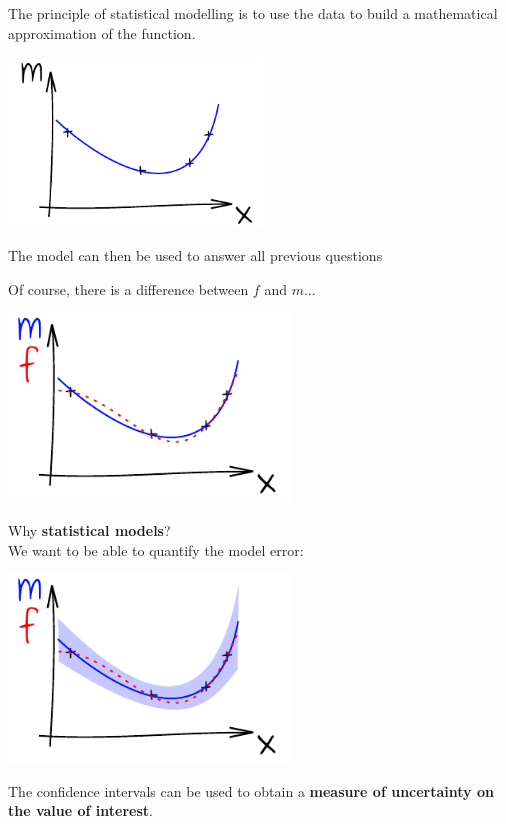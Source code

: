 \subsection{}

\begin{frame}{}
The principle of statistical modelling is to use the data to build a mathematical approximation of the function.
\begin{center}
\includegraphics[height=4.5cm]{1_stat_models/figures/ink_m}
\end{center}
The model can then be used to answer all previous questions
\end{frame}

\begin{frame}{}
Of course, there is a difference between $f$ and $m$...
\begin{center}
\includegraphics[height=5cm]{1_stat_models/figures/ink_mf}
\end{center}
\end{frame}

\begin{frame}{}
Why \textbf{statistical models}? \\We want to be able to quantify the model error:
\begin{center}
\includegraphics[height=5cm]{1_stat_models/figures/ink_mconfint}
\end{center}
The confidence intervals can be used to obtain a \textbf{measure of uncertainty on the value of interest}.
\end{frame}


